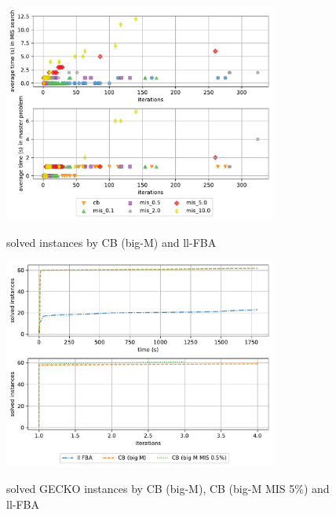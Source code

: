 \begin{figure}[h!]
    \caption{solved instances by CB (big-M) and ll-FBA}
    \centering
    \includegraphics[width=0.8\textwidth]{Images/mis_comparison_time_vs_iterations_big_m.pdf}
    \label{fig:mis_comparison_time_vs_iterations_big_m}
\end{figure}


\begin{figure}[h!]
    \caption{solved GECKO instances by CB (big-M), CB (big-M MIS 5\%) and ll-FBA}
    \centering
    \includegraphics[width=0.8\textwidth]{Images/comparison_solved_instances_gecko_1.0e-8.pdf}
    \label{fig:comparison_gecko}
\end{figure}

\clearpage
